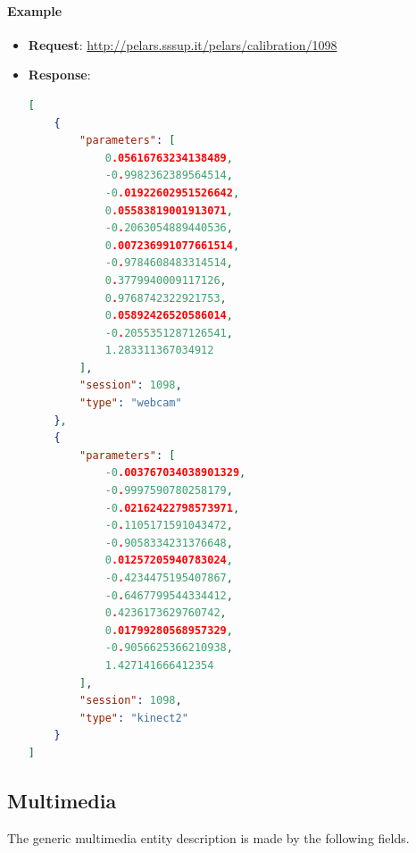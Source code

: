 \documentclass[a4paper,notitlepage,onecolumn]{hitec}  %
\begin{document}
\paragraph{Example}
\begin{itemize}
\item \textbf{Request}:  \url{http://pelars.sssup.it/pelars/calibration/1098} 
\item \textbf{Response}: 
\begin{lstlisting}[language=json,firstnumber=1]
[
    {
        "parameters": [
            0.05616763234138489,
            -0.9982362389564514,
            -0.01922602951526642,
            0.05583819001913071,
            -0.2063054889440536,
            0.007236991077661514,
            -0.9784608483314514,
            0.3779940009117126,
            0.9768742322921753,
            0.05892426520586014,
            -0.2055351287126541,
            1.283311367034912
        ],
        "session": 1098,
        "type": "webcam"
    },
    {
        "parameters": [
            -0.003767034038901329,
            -0.9997590780258179,
            -0.02162422798573971,
            -0.1105171591043472,
            -0.9058334231376648,
            0.01257205940783024,
            -0.4234475195407867,
            -0.6467799544334412,
            0.4236173629760742,
            0.01799280568957329,
            -0.9056625366210938,
            1.427141666412354
        ],
        "session": 1098,
        "type": "kinect2"
    }
]
\end{lstlisting}
\end{itemize}

\subsection{Multimedia}
The generic multimedia entity description is made by the following fields.
\end{document}
